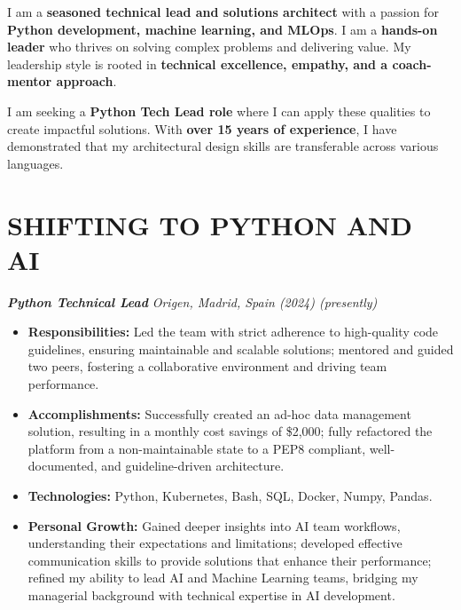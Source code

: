 \documentclass[a4paper,10pt]{article}
\begin{document}
\noindent
\begin{minipage}[t]{0.65\textwidth}
\begin{minipage}[t]{\dimexpr\linewidth-25px}
\justifying

I am a \textbf{seasoned technical lead and solutions architect} with a passion for \textbf{Python development, machine learning, and MLOps}. I am a \textbf{hands-on leader} who thrives on solving complex problems and delivering value. My leadership style is rooted in \textbf{technical excellence, empathy, and a coach-mentor approach}.

\vspace{0.5cm}

I am seeking a \textbf{Python Tech Lead role} where I can apply these qualities to create impactful solutions. With \textbf{over 15 years of experience}, I have demonstrated that my architectural design skills are transferable across various languages.

    \section*{\large SHIFTING TO PYTHON AND AI}
    \textbf{\textit{Python Technical Lead}}
    \textit{\small Origen, Madrid, Spain (2024) (presently)}
    \vspace{0.3cm}
    \begin{itemize}[leftmargin=*]
        \item \textbf{Responsibilities:} Led the team with strict adherence to high-quality code guidelines, ensuring maintainable and scalable solutions; mentored and guided two peers, fostering a collaborative environment and driving team performance.
        \item \textbf{Accomplishments:} Successfully created an ad-hoc data management solution, resulting in a monthly cost savings of \$2,000; fully refactored the platform from a non-maintainable state to a PEP8 compliant, well-documented, and guideline-driven architecture.
        \item \textbf{Technologies:} Python, Kubernetes, Bash, SQL, Docker, Numpy, Pandas.
        \item \textbf{Personal Growth:} Gained deeper insights into AI team workflows, understanding their expectations and limitations; developed effective communication skills to provide solutions that enhance their performance; refined my ability to lead AI and Machine Learning teams, bridging my managerial background with technical expertise in AI development.
    \end{itemize}


\end{minipage}
\end{minipage}
\end{document}
